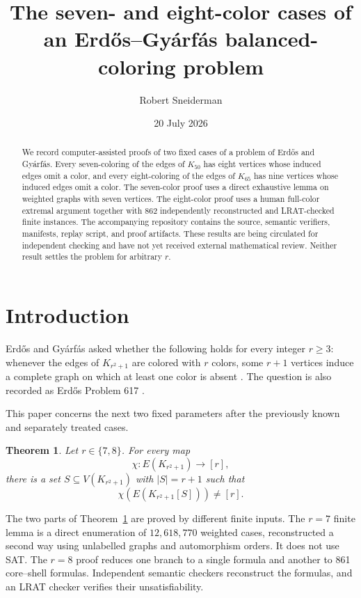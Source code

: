 \documentclass[11pt,reqno,a4paper]{amsart}
\title[The seven- and eight-color cases]{The seven- and eight-color cases of an Erd\H{o}s--Gy\'arf\'as balanced-coloring problem}
\author{Robert Sneiderman}
\date{20 July 2026}
\newtheorem{theorem}{Theorem}[section]
\theoremstyle{definition}
\theoremstyle{remark}
\begin{document}
\raggedbottom
{}

\begin{abstract}
We record computer-assisted proofs of two fixed cases of a problem of
Erd\H{o}s and Gy\'arf\'as. Every seven-coloring of the edges of $K_{50}$
has eight vertices whose induced edges omit a color, and every
eight-coloring of the edges of $K_{65}$ has nine vertices whose induced
edges omit a color. The seven-color proof uses a direct exhaustive lemma on
weighted graphs with seven vertices. The eight-color proof uses a human
full-color extremal argument together with 862 independently reconstructed
and LRAT-checked finite instances. The accompanying repository contains the
source, semantic verifiers, manifests, replay script, and proof artifacts.
These results are being circulated for independent checking and have not yet
received external mathematical review. Neither result settles the problem
for arbitrary $r$.
\end{abstract}

\maketitle

\section{Introduction}

Erd\H{o}s and Gy\'arf\'as asked whether the following holds for every
integer $r\geq3$: whenever the edges of $K_{r^2+1}$ are colored with $r$
colors, some $r+1$ vertices induce a complete graph on which at least one
color is absent \cite{ErdosGyarfas1999}. The question is also recorded as
Erd\H{o}s Problem 617 \cite{ErdosProblems617}.

This paper concerns the next two fixed parameters after the previously
known and separately treated cases.

\begin{theorem}\label{thm:combined}
Let $r\in\{7,8\}$. For every map
\[
  \chi:E(K_{r^2+1})\longrightarrow[r],
\]
there is a set $S\subseteq V(K_{r^2+1})$ with $|S|=r+1$ such that
\[
  \chi\!\left(E(K_{r^2+1}[S])\right)\ne[r].
\]
\end{theorem}

The two parts of Theorem~\ref{thm:combined} are proved by different finite
inputs. The $r=7$ finite lemma is a direct enumeration of
$12{,}618{,}770$ weighted cases, reconstructed a second way using
unlabelled graphs and automorphism orders. It does not use SAT. The $r=8$
proof reduces one branch to a single formula and another to 861
core--shell formulas. Independent semantic checkers reconstruct the
formulas, and an LRAT checker verifies their unsatisfiability.
\end{document}
